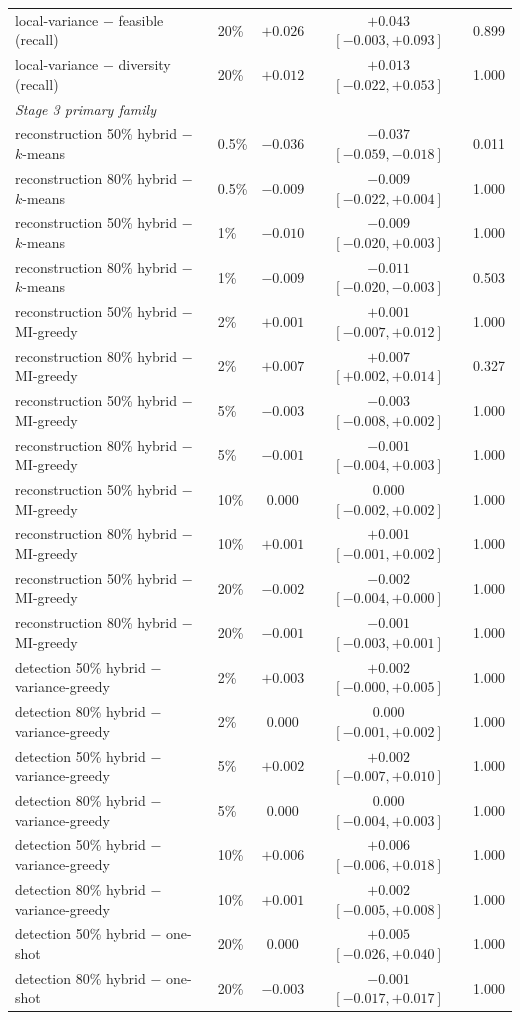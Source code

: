 \begin{tabular}{llccc}
local-variance $-$ feasible (recall) & 20\% & ${+}0.026$ & ${+}0.043$ $[-0.003, {+}0.093]$ & 0.899 \\
local-variance $-$ diversity (recall) & 20\% & ${+}0.012$ & ${+}0.013$ $[-0.022, {+}0.053]$ & 1.000 \\
\multicolumn{5}{l}{\emph{Stage 3 primary family}} \\
reconstruction 50\% hybrid $-$ $k$-means & 0.5\% & $-0.036$ & $-0.037$ $[-0.059, -0.018]$ & 0.011 \\
reconstruction 80\% hybrid $-$ $k$-means & 0.5\% & $-0.009$ & $-0.009$ $[-0.022, {+}0.004]$ & 1.000 \\
reconstruction 50\% hybrid $-$ $k$-means & 1\% & $-0.010$ & $-0.009$ $[-0.020, {+}0.003]$ & 1.000 \\
reconstruction 80\% hybrid $-$ $k$-means & 1\% & $-0.009$ & $-0.011$ $[-0.020, -0.003]$ & 0.503 \\
reconstruction 50\% hybrid $-$ MI-greedy & 2\% & ${+}0.001$ & ${+}0.001$ $[-0.007, {+}0.012]$ & 1.000 \\
reconstruction 80\% hybrid $-$ MI-greedy & 2\% & ${+}0.007$ & ${+}0.007$ $[{+}0.002, {+}0.014]$ & 0.327 \\
reconstruction 50\% hybrid $-$ MI-greedy & 5\% & $-0.003$ & $-0.003$ $[-0.008, {+}0.002]$ & 1.000 \\
reconstruction 80\% hybrid $-$ MI-greedy & 5\% & $-0.001$ & $-0.001$ $[-0.004, {+}0.003]$ & 1.000 \\
reconstruction 50\% hybrid $-$ MI-greedy & 10\% & $0.000$ & $0.000$ $[-0.002, {+}0.002]$ & 1.000 \\
reconstruction 80\% hybrid $-$ MI-greedy & 10\% & ${+}0.001$ & ${+}0.001$ $[-0.001, {+}0.002]$ & 1.000 \\
reconstruction 50\% hybrid $-$ MI-greedy & 20\% & $-0.002$ & $-0.002$ $[-0.004, {+}0.000]$ & 1.000 \\
reconstruction 80\% hybrid $-$ MI-greedy & 20\% & $-0.001$ & $-0.001$ $[-0.003, {+}0.001]$ & 1.000 \\
detection 50\% hybrid $-$ variance-greedy & 2\% & ${+}0.003$ & ${+}0.002$ $[-0.000, {+}0.005]$ & 1.000 \\
detection 80\% hybrid $-$ variance-greedy & 2\% & $0.000$ & $0.000$ $[-0.001, {+}0.002]$ & 1.000 \\
detection 50\% hybrid $-$ variance-greedy & 5\% & ${+}0.002$ & ${+}0.002$ $[-0.007, {+}0.010]$ & 1.000 \\
detection 80\% hybrid $-$ variance-greedy & 5\% & $0.000$ & $0.000$ $[-0.004, {+}0.003]$ & 1.000 \\
detection 50\% hybrid $-$ variance-greedy & 10\% & ${+}0.006$ & ${+}0.006$ $[-0.006, {+}0.018]$ & 1.000 \\
detection 80\% hybrid $-$ variance-greedy & 10\% & ${+}0.001$ & ${+}0.002$ $[-0.005, {+}0.008]$ & 1.000 \\
detection 50\% hybrid $-$ one-shot & 20\% & $0.000$ & ${+}0.005$ $[-0.026, {+}0.040]$ & 1.000 \\
detection 80\% hybrid $-$ one-shot & 20\% & $-0.003$ & $-0.001$ $[-0.017, {+}0.017]$ & 1.000 \\
\bottomrule
\end{tabular}